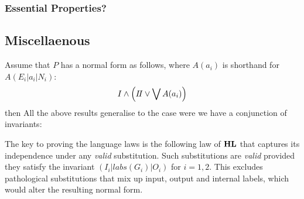 \subsubsection{Essential Properties?}

\subsection{Miscellaenous}


Assume that $P$ has a normal form as follows,
where $A(a_i)$ is shorthand for $A(E_i|a_i|N_i)$:
\[
   I \land \left( I\!I \lor \bigvee A(a_i) \right)
\]
then
All the above results generalise to the case were we have a conjunction
of invariants:


The key to proving the language laws is the following law of $\mathbf{HL}$
that captures its independence under any \emph{valid} substitution.
Such substitutions are \emph{valid} provided they satisfy the invariant
$(I_i | labs(G_i) | O_i)$ for $i=1,2$.
This excludes pathological substitutions that mix up input, output
and internal labels, which would alter the resulting normal form.
